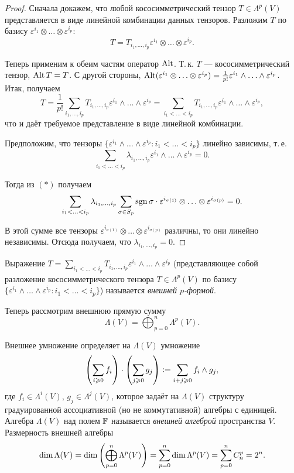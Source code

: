 \begin{proof}
    Сначала докажем, что любой кососимметрический тензор $T \in \Lambda^p(V)$ представляется в виде линейной комбинации данных тензоров. Разложим $T$ по базису $\varepsilon^{i_1} \otimes \ldots \otimes \varepsilon^{i_p}$:
    \[
        T = T_{i_1, \ldots, i_p}\varepsilon^{i_1} \otimes \ldots \otimes \varepsilon^{i_p}.
    \]

    Теперь применим к обеим частям оператор $\operatorname{Alt}$. Т.\,к. $T$ --- кососимметрический тензор, $\operatorname{Alt} T = T$. С другой стороны, $\operatorname{Alt}(\varepsilon^{i_1} \otimes \ldots \otimes \varepsilon^{i_p}) = \frac{1}{p!}\varepsilon^{i_1} \wedge \ldots \wedge \varepsilon^{i_p}$. Итак, получаем
    \[
        T = \frac{1}{p!}\sum_{i_1, \ldots, i_p}T_{i_1, \ldots, i_p}\varepsilon^{i_1}\wedge \ldots \wedge \varepsilon^{i_p} = \sum_{i_1 < \ldots < i_p}T_{i_1, \ldots, i_p}\varepsilon^{i_1} \wedge \ldots \wedge \varepsilon^{i_p},
    \]
    что и даёт требуемое представление в виде линейной комбинации.

    Предположим, что тензоры $\{\varepsilon^{i_1} \wedge \ldots \wedge \varepsilon^{i_p} : i_1 < \ldots < i_p\}$ линейно зависимы, т.\,е.
    \[
        \sum_{i_1 < \ldots < i_p}\lambda_{i_1, \ldots, i_p}\varepsilon^{i_1} \wedge \ldots \wedge \varepsilon^{i_p} = 0.
    \]

    Тогда из $(\ast)$ получаем
    \[
        \sum_{i_1 < \ldots < i_p}\lambda_{i_1, \ldots, i_p}\sum_{\sigma \in S_p}\operatorname{sgn}\sigma \cdot \varepsilon^{i_{\sigma(1)}} \otimes \ldots \otimes \varepsilon^{i_{\sigma(p)}} = 0.
    \]

    В этой сумме все тензоры $\varepsilon^{i_{\sigma(1)}} \otimes \ldots \otimes \varepsilon^{i_{\sigma(p)}}$ различны, то они линейно независимы. Отсюда получаем, что $\lambda_{i_1, \ldots, i_p} = 0$.
\end{proof}

\begin{definition}
    Выражение $T = \sum\limits_{i_1 < \ldots < i_p}T_{i_1, \ldots, i_p}\varepsilon^{i_1} \wedge \ldots \wedge \varepsilon^{i_p}$ (представляющее собой разложение кососимметрического тензора $T \in \Lambda^p(V)$ по базису $\{\varepsilon^{i_1} \wedge \ldots \wedge \varepsilon^{i_p} : i_1 < \ldots < i_p\}$) называется \textit{внешней $p$-формой}.
\end{definition}

Теперь рассмотрим внешнюю прямую сумму
\[
    \Lambda(V) = \bigoplus_{p = 0}^n\Lambda^p(V).
\]

Внешнее умножение определяет на $\Lambda(V)$ умножение
\[
    \left(\sum_{i \geqslant 0}f_i\right) \cdot \left(\sum_{j \geqslant 0}g_j\right) \vcentcolon = \sum_{i + j \geqslant 0}f_i \wedge g_j,
\]
где $f_i \in \Lambda^i(V)$, $g_j \in \Lambda^j(V)$, которое задаёт на $\Lambda(V)$ структуру градуированной ассоциативной (но не коммутативной) алгебры с единицей. Алгебра $\Lambda(V)$ над полем $\mathbb{F}$ называется \textit{внешней алгеброй} пространства $V$. Размерность внешней алгебры
\[
    \dim\Lambda(V) = \dim\left(\bigoplus_{p = 0}^n\Lambda^p(V)\right) = \sum_{p = 0}^n\dim\Lambda^p(V) = \sum_{p = 0}^nC_n^p = 2^n.
\]


